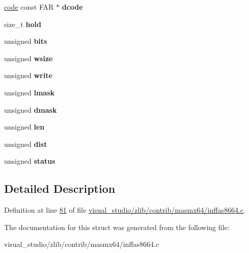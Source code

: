\begin{DoxyCompactItemize}
\mbox{\label{structinffast__ar_a5526b109c244e7445d479f45527771eb}} 
\hyperlink{structcode}{code} const F\+AR $\ast$ {\bfseries dcode}
\item 
\mbox{\label{structinffast__ar_a530e9f7b8f0209f25a182e9213566dcc}} 
size\+\_\+t {\bfseries hold}
\item 
\mbox{\label{structinffast__ar_ac76d75fe14ea008e521f2bc2ce1d5e59}} 
unsigned {\bfseries bits}
\item 
\mbox{\label{structinffast__ar_aea8bf36d1a700feff5f352a3254769e7}} 
unsigned {\bfseries wsize}
\item 
\mbox{\label{structinffast__ar_a8340ad468ac7a479c260461270ed5c25}} 
unsigned {\bfseries write}
\item 
\mbox{\label{structinffast__ar_ac35e25838e6392c88726753fc928ec62}} 
unsigned {\bfseries lmask}
\item 
\mbox{\label{structinffast__ar_a426c8cbba93c004301f5773c91e3f452}} 
unsigned {\bfseries dmask}
\item 
\mbox{\label{structinffast__ar_a949ba2d6aaf77490aef1fbc510985b3f}} 
unsigned {\bfseries len}
\item 
\mbox{\label{structinffast__ar_a0495c603c07ee75c8d16832b2d70a1f4}} 
unsigned {\bfseries dist}
\item 
\mbox{\label{structinffast__ar_ad769d1cd628970f6b950b196f0b71e3c}} 
unsigned {\bfseries status}
\end{DoxyCompactItemize}


\subsection{Detailed Description}


Definition at line \hyperlink{visual__studio_2zlib_2contrib_2masmx64_2inffas8664_8c_source_l00081}{81} of file \hyperlink{visual__studio_2zlib_2contrib_2masmx64_2inffas8664_8c_source}{visual\+\_\+studio/zlib/contrib/masmx64/inffas8664.\+c}.



The documentation for this struct was generated from the following file\+:\begin{DoxyCompactItemize}
\item 
visual\+\_\+studio/zlib/contrib/masmx64/inffas8664.\+c\end{DoxyCompactItemize}

